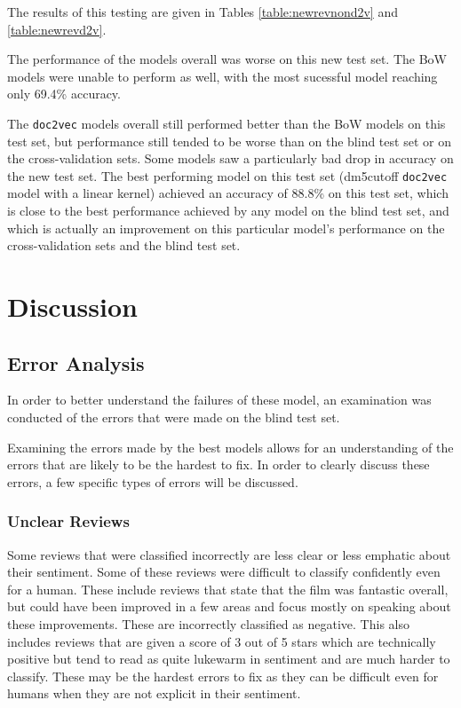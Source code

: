 \documentclass[twocolumn]{article}
\begin{document}
The results of this testing are given in Tables \ref{table:newrevnond2v} and \ref{table:newrevd2v}.

The performance of the models overall was worse on this new test set. The BoW models were unable to perform as well, with the most sucessful model reaching only 69.4\% accuracy.

The \texttt{doc2vec} models overall still performed better than the BoW models on this test set, but performance still tended to be worse than on the blind test set or on the cross-validation sets. Some models saw a particularly bad drop in accuracy on the new test set. The best performing model on this test set (dm5cutoff \texttt{doc2vec} model with a linear kernel) achieved an accuracy of 88.8\% on this test set, which is close to the best performance achieved by any model on the blind test set, and which is actually an improvement on this particular model's performance on the cross-validation sets and the blind test set.

\section{Discussion}


\subsection{Error Analysis}

In order to better understand the failures of these model, an examination was conducted of the errors that were made on the blind test set.

Examining the errors made by the best models allows for an understanding of the errors that are likely to be the hardest to fix. In order to clearly discuss these errors, a few specific types of errors will be discussed.

\subsubsection{Unclear Reviews}

Some reviews that were classified incorrectly are less clear or less emphatic about their sentiment. Some of these reviews were difficult to classify confidently even for a human. These include reviews that state that the film was fantastic overall, but could have been improved in a few areas and focus mostly on speaking about these improvements. These are incorrectly classified as negative. This also includes reviews that are given a score of 3 out of 5 stars which are technically positive but tend to read as quite lukewarm in sentiment and are much harder to classify. These may be the hardest errors to fix as they can be difficult even for humans when they are not explicit in their sentiment.
\end{document}
